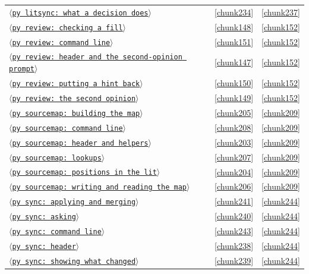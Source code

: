 \documentclass[10pt,a4paper]{article}
\newcounter{chunk}
\newcommand{\chunkname}[1]{\ensuremath{\langle}\texttt{#1}\ensuremath{\rangle}}
\begin{document}
\begin{longtable}{@{}p{}rp{}@{}}
\hyperref[chunk234]{\chunkname{py litsync: what a decision does}} & \ref*{chunk234} & \hyperref[chunk237]{\ref*{chunk237}} \\
\hyperref[chunk148]{\chunkname{py review: checking a fill}} & \ref*{chunk148} & \hyperref[chunk152]{\ref*{chunk152}} \\
\hyperref[chunk151]{\chunkname{py review: command line}} & \ref*{chunk151} & \hyperref[chunk152]{\ref*{chunk152}} \\
\hyperref[chunk147]{\chunkname{py review: header and the second-opinion prompt}} & \ref*{chunk147} & \hyperref[chunk152]{\ref*{chunk152}} \\
\hyperref[chunk150]{\chunkname{py review: putting a hint back}} & \ref*{chunk150} & \hyperref[chunk152]{\ref*{chunk152}} \\
\hyperref[chunk149]{\chunkname{py review: the second opinion}} & \ref*{chunk149} & \hyperref[chunk152]{\ref*{chunk152}} \\
\hyperref[chunk205]{\chunkname{py sourcemap: building the map}} & \ref*{chunk205} & \hyperref[chunk209]{\ref*{chunk209}} \\
\hyperref[chunk208]{\chunkname{py sourcemap: command line}} & \ref*{chunk208} & \hyperref[chunk209]{\ref*{chunk209}} \\
\hyperref[chunk203]{\chunkname{py sourcemap: header and helpers}} & \ref*{chunk203} & \hyperref[chunk209]{\ref*{chunk209}} \\
\hyperref[chunk207]{\chunkname{py sourcemap: lookups}} & \ref*{chunk207} & \hyperref[chunk209]{\ref*{chunk209}} \\
\hyperref[chunk204]{\chunkname{py sourcemap: positions in the lit}} & \ref*{chunk204} & \hyperref[chunk209]{\ref*{chunk209}} \\
\hyperref[chunk206]{\chunkname{py sourcemap: writing and reading the map}} & \ref*{chunk206} & \hyperref[chunk209]{\ref*{chunk209}} \\
\hyperref[chunk241]{\chunkname{py sync: applying and merging}} & \ref*{chunk241} & \hyperref[chunk244]{\ref*{chunk244}} \\
\hyperref[chunk240]{\chunkname{py sync: asking}} & \ref*{chunk240} & \hyperref[chunk244]{\ref*{chunk244}} \\
\hyperref[chunk243]{\chunkname{py sync: command line}} & \ref*{chunk243} & \hyperref[chunk244]{\ref*{chunk244}} \\
\hyperref[chunk238]{\chunkname{py sync: header}} & \ref*{chunk238} & \hyperref[chunk244]{\ref*{chunk244}} \\
\hyperref[chunk239]{\chunkname{py sync: showing what changed}} & \ref*{chunk239} & \hyperref[chunk244]{\ref*{chunk244}} \\

\end{longtable}
\end{document}
